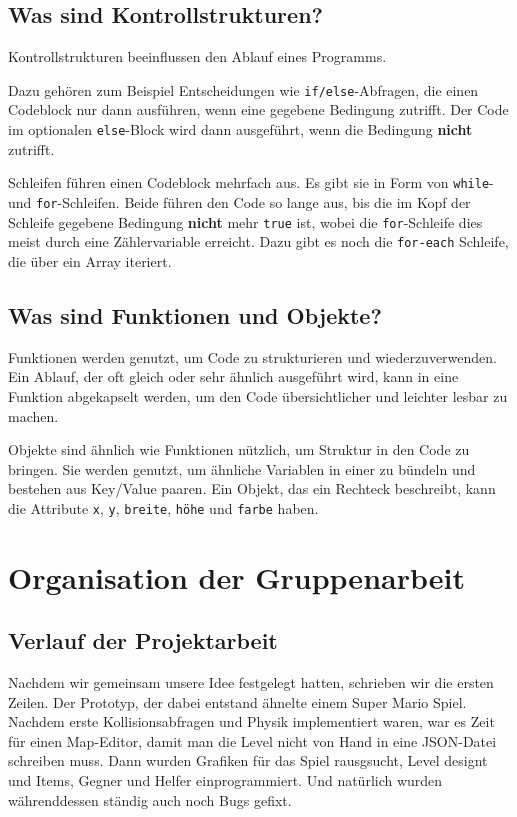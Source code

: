 \documentclass[12pt]{report}
\begin{document}
    \section{Was sind Kontrollstrukturen?}
    Kontrollstrukturen beeinflussen den Ablauf eines Programms.

    Dazu gehören zum Beispiel Entscheidungen wie \texttt{if/else}-Abfragen, die einen Codeblock nur dann
    ausführen, wenn eine gegebene Bedingung zutrifft. Der Code im optionalen \texttt{else}-Block
    wird dann ausgeführt, wenn die Bedingung \textbf{nicht} zutrifft.

    Schleifen führen einen Codeblock mehrfach aus. Es gibt sie in Form von
    \texttt{while}- und \texttt{for}-Schleifen. Beide führen den Code so lange aus,
    bis die im Kopf der Schleife gegebene Bedingung \textbf{nicht} mehr \texttt{true} ist,
    wobei die \texttt{for}-Schleife dies meist durch eine Zählervariable erreicht.
    Dazu gibt es noch die \texttt{for-each} Schleife, die über ein Array iteriert.

    \section{Was sind Funktionen und Objekte?}
    Funktionen werden genutzt, um Code zu strukturieren und wiederzuverwenden.
    Ein Ablauf, der oft gleich oder sehr ähnlich ausgeführt wird, kann in eine
    Funktion abgekapselt werden, um den Code übersichtlicher und leichter
    lesbar zu machen.

    Objekte sind ähnlich wie Funktionen nützlich, um Struktur in den Code zu 
    bringen. Sie werden genutzt, um ähnliche Variablen in einer zu bündeln und
    bestehen aus Key/Value paaren. Ein Objekt, das ein Rechteck beschreibt,
    kann die Attribute \texttt{x}, \texttt{y}, \texttt{breite}, 
    \texttt{höhe} und \texttt{farbe} haben.

    \chapter{Organisation der Gruppenarbeit}

    \section{Verlauf der Projektarbeit}
    Nachdem wir gemeinsam unsere Idee festgelegt hatten, schrieben wir die
    ersten Zeilen. Der Prototyp, der dabei entstand ähnelte einem Super Mario
    Spiel. Nachdem erste Kollisionsabfragen und Physik implementiert waren,
    war es Zeit für einen Map-Editor, damit man die Level nicht von Hand in eine
    JSON-Datei schreiben muss. Dann wurden Grafiken für das Spiel rausgsucht,
    Level designt und Items, Gegner und Helfer einprogrammiert. Und natürlich
    wurden währenddessen ständig auch noch Bugs gefixt.
\end{document}
